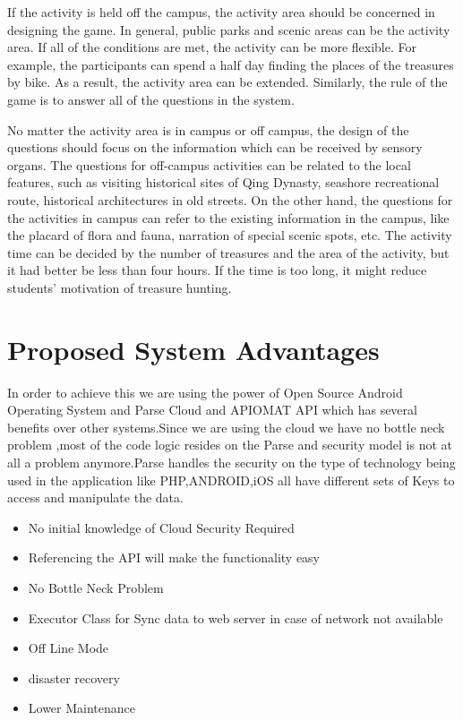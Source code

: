 \documentclass[12pt]{report}
\begin{document}
	If the activity is held off the campus, the activity area should be concerned in designing the game. In general, public parks and scenic areas can be the activity area. If all of the conditions are met, the activity can be more flexible. For example, the participants can spend a half day finding the places of the treasures by bike. As a result, the activity area can be extended. Similarly, the rule of the game is to answer all of the questions in the system.
	
	No matter the activity area is in campus or off campus, the design of the questions should focus on the information which can be received by sensory organs. The questions for off-campus activities can be related to the local features, such as visiting historical sites of Qing Dynasty, seashore recreational route, historical architectures in old streets. On the other hand, the questions for the activities in campus can refer to the existing information in the campus, like the placard of flora and fauna, narration of special scenic spots, etc. The activity time can be decided by the number of treasures and the area of the activity, but it had better be less than four hours. If the time is too long, it might reduce students’ motivation of treasure hunting.
	
	
	
	
	
	
	\section{Proposed  System Advantages}
	In order to achieve this we are using the power of Open Source Android Operating System and Parse Cloud and APIOMAT API which has several benefits over other systems.Since we are using the cloud we have no bottle neck problem ,most of the code logic resides on the Parse
	and security model is not at all a problem anymore.Parse handles the security on the type of technology being used in the application like PHP,ANDROID,iOS all have different sets of Keys to access and manipulate the data.
	
	
	
	\begin{itemize}
	
	
	
	 \item No initial knowledge of Cloud Security Required
	\item Referencing the API will make the functionality easy
	\item  No Bottle Neck Problem 
	\item Executor Class for Sync data to web server in case of network not available
	\item Off Line Mode
	\item  disaster recovery
	\item Lower Maintenance  
	
	
	
	\end{itemize}
	
\end{document}

